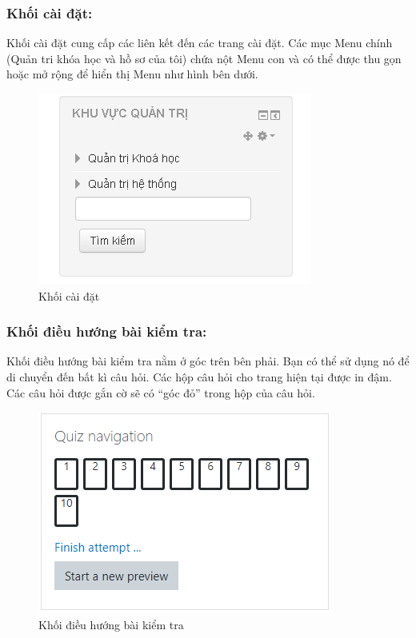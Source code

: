 \subsubsection{Khối cài đặt:}
Khối cài đặt cung cấp các liên kết đến các trang cài đặt. Các mục Menu chính (Quản tri khóa học và hồ sơ của tôi) chứa nột Menu con và có thể được thu gọn hoặc mở rộng để hiển thị Menu như hình bên dưới.
\begin{center}
	\begin{figure}[htp]
		\begin{center}
			\includegraphics[scale=1]{img/khoicaidat}
		\end{center}
		\caption{Khối cài đặt}
		\label{refhinh6}
	\end{figure}
\end{center}

\subsubsection{Khối điều hướng bài kiểm tra:}
Khối điều hướng bài kiểm tra nằm ở góc trên bên phải. Bạn có thể sử dụng nó để di chuyển đến bất kì câu hỏi. Các hộp câu hỏi cho trang hiện tại được in đậm. Các câu hỏi được gắn cờ sẽ có “góc đỏ” trong hộp của câu hỏi.
\begin{center}
	\begin{figure}[htp]
		\begin{center}
			\includegraphics[scale=1]{img/khoibaikiemtra}
		\end{center}
		\caption{Khối điều hướng bài kiểm tra}
		\label{refhinh7}
	\end{figure}
\end{center}

